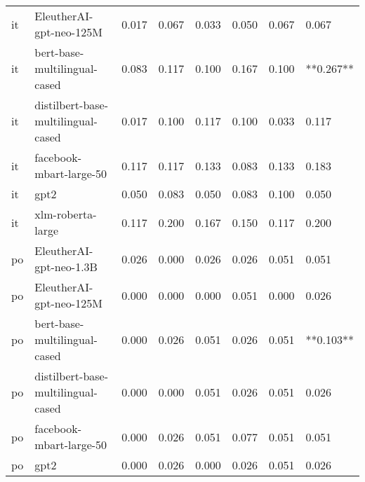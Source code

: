 \begin{tabular}{llllllll}
      it &            EleutherAI-gpt-neo-125M &     0.017 &                     0.067 &                 0.033 &                  0.050 &                                   0.067 &     0.067 \\
      it &       bert-base-multilingual-cased &     0.083 &                     0.117 &                 0.100 &                  0.167 &                                   0.100 & **0.267** \\
      it & distilbert-base-multilingual-cased &     0.017 &                     0.100 &                 0.117 &                  0.100 &                                   0.033 &     0.117 \\
      it &            facebook-mbart-large-50 &     0.117 &                     0.117 &                 0.133 &                  0.083 &                                   0.133 &     0.183 \\
      it &                               gpt2 &     0.050 &                     0.083 &                 0.050 &                  0.083 &                                   0.100 &     0.050 \\
      it &                  xlm-roberta-large &     0.117 &                     0.200 &                 0.167 &                  0.150 &                                   0.117 &     0.200 \\
      po &            EleutherAI-gpt-neo-1.3B &     0.026 &                     0.000 &                 0.026 &                  0.026 &                                   0.051 &     0.051 \\
      po &            EleutherAI-gpt-neo-125M &     0.000 &                     0.000 &                 0.000 &                  0.051 &                                   0.000 &     0.026 \\
      po &       bert-base-multilingual-cased &     0.000 &                     0.026 &                 0.051 &                  0.026 &                                   0.051 & **0.103** \\
      po & distilbert-base-multilingual-cased &     0.000 &                     0.000 &                 0.051 &                  0.026 &                                   0.051 &     0.026 \\
      po &            facebook-mbart-large-50 &     0.000 &                     0.026 &                 0.051 &                  0.077 &                                   0.051 &     0.051 \\
      po &                               gpt2 &     0.000 &                     0.026 &                 0.000 &                  0.026 &                                   0.051 &     0.026 \\

\end{tabular}

